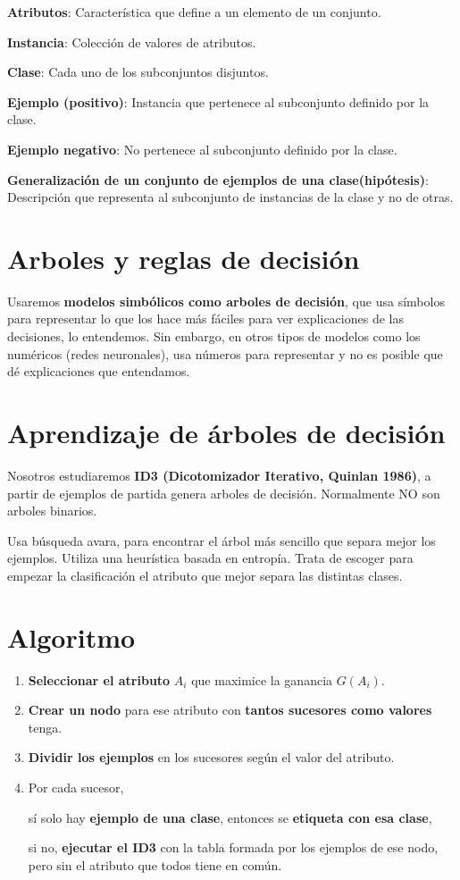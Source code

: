 \documentclass[12pt]{report} %
\begin{document}
\textbf{Atributos}: Característica que define a un elemento de un
conjunto.

\textbf{Instancia}: Colección de valores de atributos.

\textbf{Clase}: Cada uno de los subconjuntos disjuntos.

\textbf{Ejemplo (positivo)}: Instancia que pertenece al subconjunto
definido por la clase.

\textbf{Ejemplo negativo}: No pertenece al subconjunto definido por la
clase.

\textbf{Generalización de un conjunto de ejemplos de una
clase(hipótesis)}: Descripción que representa al subconjunto de
instancias de la clase y no de otras.

\section{Arboles y reglas de
decisión}

Usaremos \textbf{modelos simbólicos como arboles de decisión}, que usa
símbolos para representar lo que los hace más fáciles para ver
explicaciones de las decisiones, lo entendemos. Sin embargo, en otros
tipos de modelos como los numéricos (redes neuronales), usa números para
representar y no es posible que dé explicaciones que entendamos.

\section{Aprendizaje de árboles de
decisión}

Nosotros estudiaremos \textbf{ID3 (Dicotomizador Iterativo, Quinlan
1986)}, a partir de ejemplos de partida genera arboles de decisión.
Normalmente NO son arboles binarios.

Usa búsqueda avara, para encontrar el árbol más sencillo que separa
mejor los ejemplos. Utiliza una heurística basada en entropía. Trata de
escoger para empezar la clasificación el atributo que mejor separa las
distintas clases.

\section{Algoritmo}

\begin{enumerate}
\def\labelenumi{\arabic{enumi}.}
\item
  \textbf{Seleccionar el atributo} \(A_i\) que maximice la ganancia
  \(G(A_i)\).
\item
  \textbf{Crear un nodo} para ese atributo con \textbf{tantos sucesores
  como valores} tenga.
\item
  \textbf{Dividir los ejemplos} en los sucesores según el valor del
  atributo.
\item
  Por cada sucesor,

  sí solo hay \textbf{ejemplo de una clase}, entonces se
  \textbf{etiqueta con esa clase},

  si no, \textbf{ejecutar el ID3} con la tabla formada por los ejemplos
  de ese nodo, pero sin el atributo que todos tiene en común.
\end{enumerate}
\end{document}
